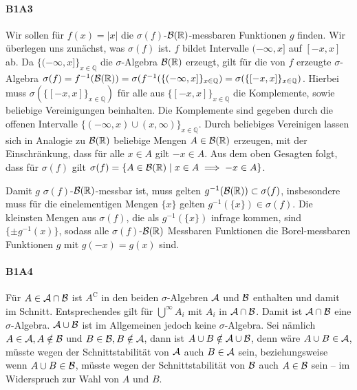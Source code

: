 \documentclass{article}
\begin{document}
\paragraph{B1A3} Wir sollen für $f(x)=|x|$ die $\sigma(f)$-${\cal B}(\mathbb{R})$-messbaren Funktionen $g$ finden.
Wir überlegen uns zunächst, was $\sigma(f)$ ist.
$f$ bildet Intervalle $(-\infty,x]$ auf  $[-x,x]$ ab.
Da $\{(-\infty,x]\}_{x\in\mathbb{Q}}$ die $\sigma$-Algebra ${\cal B}(\mathbb{\mathbb{R}})$ erzeugt, gilt für die von $f$ erzeugte $\sigma$-Algebra $\sigma(f)=f^{-1}({\cal B}(\mathbb{R}))=\sigma(f^{-1}(\{(-\infty,x]\}_{x\in\mathbb{Q}})=\sigma(\{[-x,x]\}_{x\in\mathbb{Q}})$.
Hierbei muss $\sigma(\{[-x,x]\}_{x\in\mathbb{Q}})$ für alle aus $\{[-x,x]\}_{x\in\mathbb{Q}}$ die Komplemente, sowie beliebige Vereinigungen beinhalten.
Die Komplemente sind gegeben durch die offenen Intervalle $\{(-\infty,x)\cup(x,\infty)\}_{x\in{\mathbb{Q}}}$.
Durch beliebiges Vereinigen lassen sich in Analogie zu ${\cal B}(\mathbb{R})$ beliebige Mengen $A\in{\cal B}(\mathbb{R})$ erzeugen, mit der Einschränkung, dass für alle $x\in A$ gilt ${-}x\in A$.
Aus dem oben Gesagten folgt, dass für $\sigma(f)$ gilt $\sigma(f)=\{A\in{\cal B}(\mathbb{R})\mid x\in A\implies{-x}\in A\}$.

Damit $g$ $\sigma(f)$-${\cal B}(\mathbb{R})$-messbar ist, muss gelten $g^{-1}({\cal B}(\mathbb{R}))\subset\sigma(f)$, insbesondere muss für die einelementigen Mengen $\{x\}$ gelten $g^{-1}(\{x\})\in\sigma(f)$.
Die kleinsten Mengen aus $\sigma(f)$, die als $g^{-1}(\{x\})$ infrage kommen, sind $\{\pm g^{-1}(x)\}$, sodass alle $\sigma(f)$-${\cal B}(\mathbb{R})$ Messbaren Funktionen die Borel-messbaren Funktionen $g$ mit $g(-x)=g(x)$ sind.

\paragraph{B1A4} Für $A\in{\cal A}\cap{\cal B}$ ist $A^\mathrm{C}$ in den beiden $\sigma$-Algebren ${\cal A}$ und ${\cal B}$ enthalten und damit im Schnitt.
Entsprechendes gilt für $\bigcup^\infty A_i$ mit $A_i$ in ${\cal A}\cap{\cal B}$.
Damit ist ${\cal A}\cap{\cal B}$ eine $\sigma$-Algebra.
${\cal A}\cup{\cal B}$ ist im Allgemeinen jedoch keine $\sigma$-Algebra.
Sei nämlich $A\in {\cal A},A\notin{\cal B}$ und $B\in{\cal B},B\notin{\cal A}$, dann ist $A\cup B\notin{\cal A}\cup{\cal B}$, denn wäre $A\cup B\in{\cal A}$, müsste wegen der Schnittstabilität von ${\cal A}$ auch $B\in{\cal A}$ sein, beziehungsweise wenn $A\cup B\in{\cal B}$, müsste wegen der Schnittstabilität von ${\cal B}$ auch $A\in{\cal B}$ sein -- im Widerspruch zur Wahl von $A$ und $B$.
\end{document}
